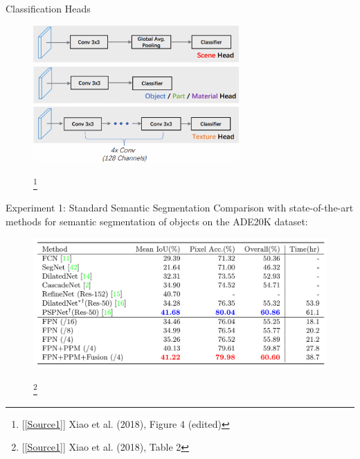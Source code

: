 \documentclass{beamer}
\newcommand\blfootnote[1]{
  \begingroup
  \renewcommand\thefootnote{}\footnote{#1}
  \addtocounter{footnote}{-1}
  \endgroup
}
\begin{document}

\begin{frame}{Classification Heads}
    \begin{figure}
        \centering
        \includegraphics[width=0.7\textwidth]{Images/ClassifierHeads.png}
        \blfootnote{[\ref{Source1}] Xiao et al. (2018), Figure 4 (edited)}
    \end{figure}
\end{frame}



\begin{frame}{Experiment 1: Standard Semantic Segmentation}
  Comparison with state-of-the-art methods for semantic segmentation of objects on the ADE20K dataset:
  \begin{figure}
    \centering
    \includegraphics[width=\textwidth]{Images/Table2.png}
    \blfootnote{[\ref{Source1}] Xiao et al. (2018), Table 2}
  \end{figure}
\end{frame}

\end{document}

